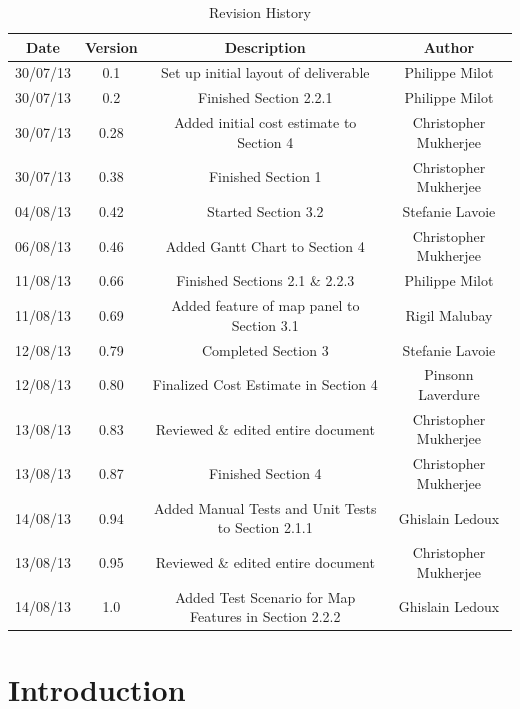 \documentclass{article}
\begin{document}
\begin{table}[htbp]
\caption{Revision History}
\begin{center}
\begin{tabular}{|c | c | c | c| }
\hline
Date & Version & Description & Author \\
\hline\hline
30/07/13 & 0.1 & Set up initial layout of deliverable & Philippe Milot \\
\hline
30/07/13 & 0.2 & Finished Section 2.2.1 & Philippe Milot \\
\hline
30/07/13 & 0.28 & Added initial cost estimate to Section 4 & Christopher Mukherjee \\
\hline
30/07/13 & 0.38 & Finished Section 1 & Christopher Mukherjee \\
\hline
04/08/13 & 0.42 & Started Section 3.2 & Stefanie Lavoie \\
\hline
06/08/13 & 0.46 & Added Gantt Chart to Section 4 & Christopher Mukherjee \\
\hline
11/08/13 & 0.66 & Finished Sections 2.1 \& 2.2.3 & Philippe Milot \\
\hline
11/08/13 & 0.69 & Added feature of map panel to Section 3.1 & Rigil Malubay \\
\hline
12/08/13 & 0.79 & Completed Section 3 & Stefanie Lavoie \\
\hline
12/08/13 & 0.80 & Finalized Cost Estimate in Section 4 & Pinsonn Laverdure \\
\hline
13/08/13 & 0.83 & Reviewed \& edited entire document & Christopher Mukherjee \\
\hline
13/08/13 & 0.87 & Finished Section 4 & Christopher Mukherjee \\
\hline
14/08/13 & 0.94 & Added Manual Tests and Unit Tests to Section 2.1.1 & Ghislain Ledoux \\
\hline
13/08/13 & 0.95 & Reviewed \& edited entire document & Christopher Mukherjee \\
\hline
14/08/13 & 1.0 & Added Test Scenario for Map Features in Section 2.2.2 & Ghislain Ledoux \\
\hline

\end{tabular}
\end{center}
\end{table}

\clearpage

\tableofcontents
\clearpage


\section{Introduction} %
\end{document}
